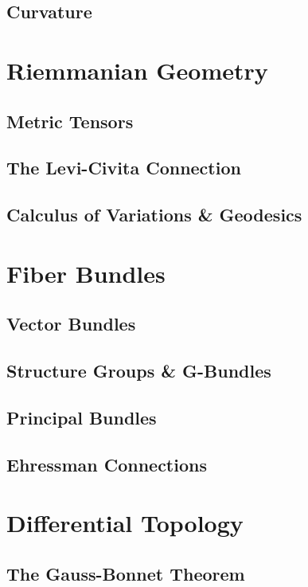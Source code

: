 \documentclass[onecolumn]{gwclass}
\begin{document}
	\subsection{Curvature}
	
	\section{Riemmanian Geometry}
	\subsection{Metric Tensors}
	\subsection{The Levi-Civita Connection}
	\subsection{Calculus of Variations \& Geodesics}
	

	\section{Fiber Bundles}
	\subsection{Vector Bundles}
	\subsection{Structure Groups \& G-Bundles}
	\subsection{Principal Bundles}
	\subsection{Ehressman Connections}
	
	
	\section{Differential Topology}
	\subsection{The Gauss-Bonnet Theorem}

	
\end{document}
